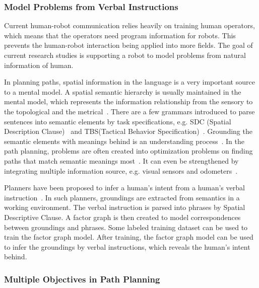 \documentclass[phd]{byuprop}
\begin{document}
\subsubsection{Model Problems from Verbal Instructions}
\label{sec:related_work:algorithm_specific_work:model_problems_from_verbal_instructions}

Current human-robot communication relies heavily on training human operators, which means that the operators need program information for robots.
This prevents the human-robot interaction being applied into more fields.
The goal of current research studies is supporting a robot to model problems from natural information of human.

In planning paths, spatial information in the language is a very important source to a mental model.
A spatial semantic hierarchy is usually maintained in the mental model, which represents the information relationship from the sensory to the topological and the metrical~\cite{kuipers1999}.
There are a few grammars introduced to parse sentences into semantic elements by task specifications, e.g. SDC (Spatial Description Clause)~\cite{tellex2011understanding} and TBS(Tactical Behavior Specification)~\cite{Boularias_2015_7953}.
Grounding the semantic elements with meanings behind is an understanding process~\cite{Kollar:2010:TUN:1734454.1734553}.
In the path planning, problems are often created into optimization problems on finding paths that match semantic meanings most~\cite{tellex2011understanding,Boularias_2015_7953}.
It can even be strengthened by integrating multiple information source, e.g. visual sensors and odometers~\cite{6696569}.

Planners have been proposed to infer a human's intent from a human's verbal instruction~\cite{howard2014natural,Duvallet2014}.
In such planners, groundings are extracted from semantics in a working environment.
The verbal instruction is parsed into phrases by Spatial Descriptive Clause. 
A factor graph is then created to model correspondences between groundings and phrases.
Some labeled training dataset can be used to train the factor graph model.
After training, the factor graph model can be used to infer the groundings by verbal instructions, which reveals the human's intent behind.

\subsubsection{Multiple Objectives in Path Planning}
\label{sec:related_work:algorithm_specific_work:multiple_objectives_in_path_planning}
\end{document}
